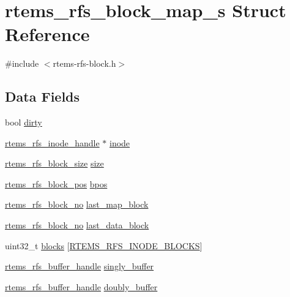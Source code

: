 \hypertarget{structrtems__rfs__block__map__s}{}\section{rtems\+\_\+rfs\+\_\+block\+\_\+map\+\_\+s Struct Reference}
\label{structrtems__rfs__block__map__s}


{\ttfamily \#include $<$rtems-\/rfs-\/block.\+h$>$}

\subsection*{Data Fields}
\begin{DoxyCompactItemize}
\item 
bool \mbox{\hyperlink{structrtems__rfs__block__map__s_aa99bf6b6620b00c0bdd84a8703275437}{dirty}}
\item 
\mbox{\hyperlink{rtems-rfs-inode_8h_a91f02dac5a2d91e072d676f3266ab8d2}{rtems\+\_\+rfs\+\_\+inode\+\_\+handle}} $\ast$ \mbox{\hyperlink{structrtems__rfs__block__map__s_a74f7b66eec17822aa175f0c19d61c28a}{inode}}
\item 
\mbox{\hyperlink{rtems-rfs-block-pos_8h_aa72438eee22908110dc633ca6b89b390}{rtems\+\_\+rfs\+\_\+block\+\_\+size}} \mbox{\hyperlink{structrtems__rfs__block__map__s_a6c5f3d804cf4bdf7dee7a6a93e85175b}{size}}
\item 
\mbox{\hyperlink{rtems-rfs-block-pos_8h_a0d8bd7482333e584a03df45e60cda226}{rtems\+\_\+rfs\+\_\+block\+\_\+pos}} \mbox{\hyperlink{structrtems__rfs__block__map__s_a5699833603dca58333e9d7f92d60cb86}{bpos}}
\item 
\mbox{\hyperlink{rtems-rfs-block-pos_8h_abbf8bb95acf9bd16ed3291f7da518e9a}{rtems\+\_\+rfs\+\_\+block\+\_\+no}} \mbox{\hyperlink{structrtems__rfs__block__map__s_a982fb2a5ea76eb2dbb21dd76dca259e3}{last\+\_\+map\+\_\+block}}
\item 
\mbox{\hyperlink{rtems-rfs-block-pos_8h_abbf8bb95acf9bd16ed3291f7da518e9a}{rtems\+\_\+rfs\+\_\+block\+\_\+no}} \mbox{\hyperlink{structrtems__rfs__block__map__s_ac8e110de9402ef2f75263c6a4244a5d8}{last\+\_\+data\+\_\+block}}
\item 
uint32\+\_\+t \mbox{\hyperlink{structrtems__rfs__block__map__s_a8358418370ab17c66051ee0d3f2abce2}{blocks}} \mbox{[}\mbox{\hyperlink{rtems-rfs-file-system_8h_a89ff31e716c58b51c65d688662acb012}{R\+T\+E\+M\+S\+\_\+\+R\+F\+S\+\_\+\+I\+N\+O\+D\+E\+\_\+\+B\+L\+O\+C\+KS}}\mbox{]}
\item 
\mbox{\hyperlink{rtems-rfs-buffer_8h_a17f97c37c5273ad28d413dfd2d175e23}{rtems\+\_\+rfs\+\_\+buffer\+\_\+handle}} \mbox{\hyperlink{structrtems__rfs__block__map__s_a406b38e6ceda414438ea3cea917a20b6}{singly\+\_\+buffer}}
\item 
\mbox{\hyperlink{rtems-rfs-buffer_8h_a17f97c37c5273ad28d413dfd2d175e23}{rtems\+\_\+rfs\+\_\+buffer\+\_\+handle}} \mbox{\hyperlink{structrtems__rfs__block__map__s_aef2105d20cc64f7465a68a9c98c40413}{doubly\+\_\+buffer}}
\end{DoxyCompactItemize}


